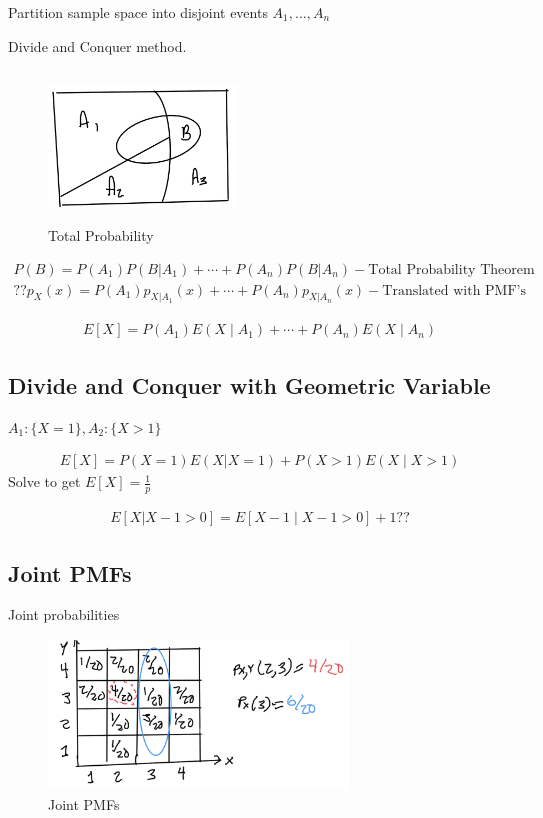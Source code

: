 Partition sample space into disjoint events $A_1, \ldots, A_n$

Divide and Conquer method.

\begin{figure}[h]
\centering
\includegraphics[width=5cm, height=4cm]{images/L02/total_prob.jpeg}
\caption{Total Probability}
\end{figure}

\begin{align}
P(B)=P(A_1)P(B|A_1) + \cdots + P(A_n)P(B|A_n) - \text{Total Probability Theorem} \\
?? p_X(x) = P(A_1)p_{X|A_1}(x) + \cdots + P(A_n)p_{X|A_n}(x) - \text{Translated with PMF's}
\end{align}

\begin{align*}
E[X]=P(A_1)E(X \mid A_1) + \cdots + P(A_n)E(X \mid A_n)
\end{align*}

\subsection{Divide and Conquer with Geometric Variable}


$A_1:\{X=1\}, A_2:\{X >1\}$

\begin{align*}
E[X]=P(X=1)E(X|X=1) + P(X > 1)E(X \mid X>1)
\end{align*}
Solve to get $E[X]=\frac{1}{p}$

\begin{align*}
E[X|X-1 >0] = E[X-1 \mid X-1>0] + 1 ??
\end{align*}

\subsection{Joint PMFs}

 Joint probabilities

\begin{figure}[h]
\centering
\includegraphics[width=8cm, height=4cm]{images/L06/joint_pmf.jpeg}
\caption{Joint PMFs}
\end{figure}
